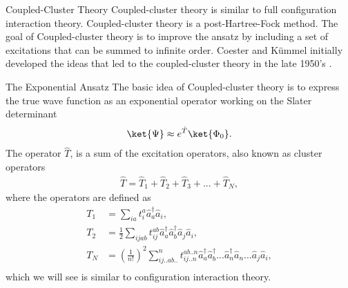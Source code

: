 \documentclass[twoside,english]{uiofysmaster}
\begin{document}
\begin{chapter}{Coupled-Cluster Theory} 
	Coupled-cluster theory is similar to full configuration
        interaction theory. Coupled-cluster theory is a
        post-Hartree-Fock method.
        The goal of Coupled-cluster theory is to
        improve the ansatz by including a set of excitations that can be summed to infinite order. Coester
        and K\"ummel initially developed the ideas that led to the
        coupled-cluster theory in the late 1950's \cite{MHJonline}.
 	
 	\begin{section}{The Exponential Ansatz}
 		The basic idea of Coupled-cluster theory is to express the true wave function as an exponential operator working on the Slater determinant \cite{ShavittAndBartlett,MHJonline,Crawford}
 		\begin{align}
	 		\ket{\Psi} \approx e^{\hat T} \ket{\Phi_0}.
	  	\end{align}
	  	The operator $\hat T$, is a sum of the excitation operators, also known as cluster operators
	  	\begin{align}
	  		\hat T = \hat T_1 + \hat T_2 + \hat T_3 + ... + \hat T_N,
	  	\end{align}
	  	where the operators are defined as
	  	\begin{align}
	  		T_1 &= \sum_{ia} t_i^a \hat a_a^{\dagger} \hat a_i, \\
	  		T_2 &= \frac{1}{2} \sum_{ijab} t_{ij}^{ab} \hat a_a^{\dagger}\hat a_b^{\dagger} \hat a_j \hat a_i, \\
	  		T_N &= \left(\frac{1}{n!}\right)^2 \sum_{ij..ab..}^n t_{ij..n}^{ab..n} \hat a_a^{\dagger}\hat a_b^{\dagger} ...\hat a_n^{\dagger} \hat a_n ... \hat a_j \hat a_i, \\
	  	\end{align}
	  	which we will see is similar to configuration interaction theory.
	\end{section}


\end{chapter}
\end{document}
